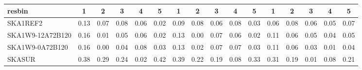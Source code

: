 \begin{table}[!htp]
{{\begin{tabular}{|lccccc||ccccc||ccccc|}
 resbin  &1 & 2 & 3 & 4 & 5 & 1 & 2 & 3 & 4 & 5 & 1 & 2 & 3 & 4 & 5 \tabularnewline \hline
SKA1REF2 & 0.13 \cellcolor{blue!18.00} & 0.07 \cellcolor{red!28.14} & 0.08 \cellcolor{green!26.40} & 0.06 \cellcolor{orange!46.00} & 0.02 \cellcolor{purple!18.00} & 0.09 \cellcolor{blue!18.00} & 0.08 \cellcolor{red!33.27} & 0.06 \cellcolor{green!18.00} & 0.08 \cellcolor{orange!60.00} & 0.03 \cellcolor{purple!19.35} & 0.06 \cellcolor{blue!18.00} & 0.08 \cellcolor{red!24.46} & 0.06 \cellcolor{green!60.00} & 0.05 \cellcolor{orange!42.00} & 0.07 \cellcolor{purple!25.41}\\ \hline 
SKA1W9-12A72B120 & 0.16 \cellcolor{blue!23.04} & 0.01 \cellcolor{red!19.45} & 0.05 \cellcolor{green!20.10} & 0.06 \cellcolor{orange!46.00} & 0.02 \cellcolor{purple!18.00} & 0.13 \cellcolor{blue!23.60} & 0.00 \cellcolor{red!18.00} & 0.07 \cellcolor{green!21.23} & 0.06 \cellcolor{orange!18.00} & 0.02 \cellcolor{purple!18.00} & 0.11 \cellcolor{blue!26.40} & 0.06 \cellcolor{red!18.00} & 0.05 \cellcolor{green!51.60} & 0.04 \cellcolor{orange!36.00} & 0.05 \cellcolor{purple!20.47}\\ \hline 
SKA1W9-0A72B120 & 0.16 \cellcolor{blue!23.04} & 0.00 \cellcolor{red!18.00} & 0.04 \cellcolor{green!18.00} & 0.08 \cellcolor{orange!60.00} & 0.03 \cellcolor{purple!19.05} & 0.13 \cellcolor{blue!23.60} & 0.02 \cellcolor{red!21.82} & 0.07 \cellcolor{green!21.23} & 0.07 \cellcolor{orange!39.00} & 0.03 \cellcolor{purple!19.35} & 0.11 \cellcolor{blue!26.40} & 0.06 \cellcolor{red!18.00} & 0.03 \cellcolor{green!34.80} & 0.01 \cellcolor{orange!18.00} & 0.04 \cellcolor{purple!18.00}\\ \hline 
SKASUR & 0.38 \cellcolor{blue!60.00} & 0.29 \cellcolor{red!60.00} & 0.24 \cellcolor{green!60.00} & 0.02 \cellcolor{orange!18.00} & 0.42 \cellcolor{purple!60.00} & 0.39 \cellcolor{blue!60.00} & 0.22 \cellcolor{red!60.00} & 0.19 \cellcolor{green!60.00} & 0.08 \cellcolor{orange!60.00} & 0.33 \cellcolor{purple!60.00} & 0.31 \cellcolor{blue!60.00} & 0.19 \cellcolor{red!60.00} & 0.01 \cellcolor{green!18.00} & 0.08 \cellcolor{orange!60.00} & 0.21 \cellcolor{purple!60.00}\tabularnewline \hline 
\end{tabular}}\hfil 
{}}
\end{table}
